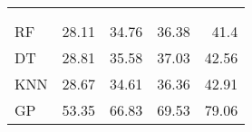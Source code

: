 \begin{margintable}
	\vspace{-0.2cm}
	\centering
	\begin{tabularx}{1\marginparwidth}{Xd{2.1}d{2.1}d{1.1}d{1.1}}
		\toprule
		&
		&    
		 &
		 &
		 \\
		\\
		\midrule
		RF & 28.11    & 34.76                     &36.38 & 41.4 \\ 
		DT                  & 28.81 					   & 35.58                     &37.03                     & 42.56 \\ 
		KNN                 & 28.67 					   & 34.61 &36.36                     & 42.91 \\ 
		GP                  & 53.35 					   & 66.83                     &69.53                     & 79.06 \\ \midrule
		

\end{tabularx}
\end{margintable}
